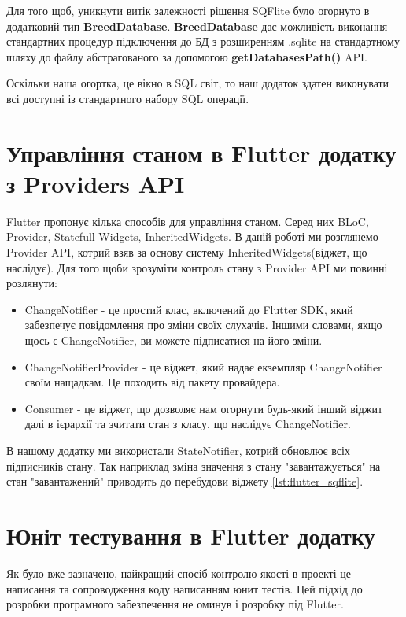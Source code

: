 Для того щоб, уникнути витік залежності рішення SQFlite було огорнуто в додатковий тип \textbf{BreedDatabase}.
\textbf{BreedDatabase} дає можливість виконання стандартних процедур підключення до БД з розширенням .sqlite
на стандартному шляху до файлу абстрагованого за допомогою \textbf{getDatabasesPath()} API.

Оскільки наша огортка, це вікно в SQL світ, то наш додаток здатен виконувати всі доступні із стандартного набору
SQL операції.


\section{Управління станом в Flutter додатку з Providers API}
\label{sec:flutter_state_app}
Flutter пропонує кілька способів для управління станом. Серед них BLoC, Provider, Statefull Widgets, InheritedWidgets.
В даній роботі ми розглянемо Provider API, котрий взяв за основу систему InheritedWidgets(віджет, що наслідує).
Для того щоби зрозуміти контроль стану з Provider API ми повинні розлянути:

\begin{itemize}
    \item ChangeNotifier - це простий клас, включений до Flutter SDK, який забезпечує повідомлення про зміни своїх слухачів. Іншими словами, якщо щось є ChangeNotifier, ви можете підписатися на його зміни.
    \item ChangeNotifierProvider - це віджет, який надає екземпляр ChangeNotifier своїм нащадкам. Це походить від пакету провайдера.
    \item Consumer - це віджет, що дозволяє нам огорнути будь-який інший віджит далі в ієрархії та зчитати стан з класу, що наслідує ChangeNotifier.
\end{itemize}

В нашому додатку ми використали StateNotifier, котрий обновлює всіх підписників стану.
Так наприклад зміна значення з стану "завантажується" на стан "завантажений" приводить до перебудови віджету \ref{lst:flutter_sqflite}.


\section{Юніт тестування в Flutter додатку}
\label{sec:flutter_unit_testing_app}
Як було вже зазначено, найкращий спосіб контролю якості в проекті це написання та сопроводження коду написанням юнит тестів.
Цей підхід до розробки програмного забезпечення не оминув і розробку під Flutter.

